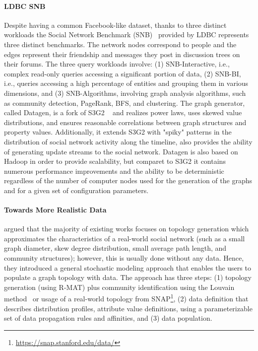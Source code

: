 \paragraph{LDBC SNB} Despite having a common Facebook-like dataset, thanks to
three distinct workloads the Social Network Benchmark
(SNB)~\cite{Erling:2015:LSN:2723372.2742786} provided by LDBC represents three
distinct benchmarks. The network nodes correspond to people and the edges
represent their friendship and messages they post in discussion trees on their
forums. The three query workloads involve: (1) SNB-Interactive, i.e., complex
read-only queries accessing a significant portion of data, (2) SNB-BI, i.e.,
queries accessing a high percentage of  entities and grouping them in various
dimensions, and (3) SNB-Algorithms, involving graph analysis algorithms, such as
community detection, PageRank, BFS, and clustering. The graph generator, called
Datagen, is a fork of S3G2 ~\cite{Pham2013} and realizes power laws, uses skewed
value distributions, and ensures reasonable correlations between graph
structures and property values. Additionally, it extends S3G2 with "spiky"
patterns in the distribution of social network activity along the timeline, also
provides the ability of generating update streams to the social network. Datagen
is also based on Hadoop in order to provide scalability, but comparet to S3G2 it
contains numerous performance improvements and the ability to be deterministic
regardless of the number of computer nodes used for the generation of the graphs
and for a given set of configuration parameters.


\paragraph{Towards More Realistic Data} \cite{Nettleton2016} argued that the majority of existing works focuses on
topology generation which approximates the characteristics of a real-world social
network (such as a small graph diameter, skew degree
distribution, small average path length, and community structures); however,  this is usually done without any data. Hence, they
introduced a general stochastic modeling approach that enables the users to
populate a graph topology with data. The approach has three steps: (1) topology
generation (using R-MAT) plus community identification using the Louvain
method~\cite{1742-5468-2008-10-P10008} or usage of a real-world topology from
SNAP\footnote{\url{https://snap.stanford.edu/data/}}, (2) data definition
that describes distribution profiles, attribute value definitions, using a
parameterizable set of data propagation rules and affinities, and (3) data
population.

